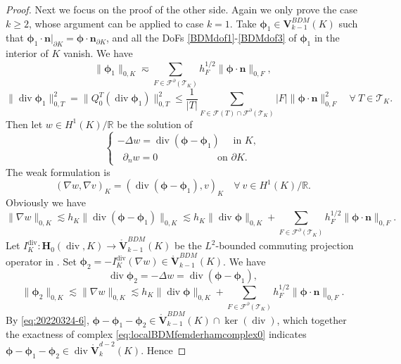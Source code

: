 \documentclass[10pt]{amsart}
\renewcommand{\div}{\operatorname{div}}
\numberwithin{equation}{section}
\begin{document}
\begin{proof}
Next we focus on the proof of the other side. Again we only prove the case $k\geq2$, whose argument can be applied to case $k=1$. Take $\boldsymbol{\phi}_1\in\boldsymbol{V}_{k-1}^{BDM}(K)$ such that $\boldsymbol{\phi}_1\cdot\boldsymbol{n}|_{\partial K}=\boldsymbol{\phi}\cdot\boldsymbol{n}_{\partial K}$, and all the DoFs \eqref{BDMdof1}-\eqref{BDMdof3} of $\boldsymbol{\phi}_1$ in the interior of $K$ vanish. We have
\begin{equation}\label{eq:20220324-5}
\|\boldsymbol{\phi}_1\|_{0,K}\eqsim \sum_{F\in\mathcal F^{\partial}(\mathcal T_K)}h_F^{1/2}\|\boldsymbol{\phi}\cdot\boldsymbol{n}\|_{0,F},
\end{equation}
$$
\|\div\boldsymbol{\phi}_1\|_{0,T}^2=\|Q_0^T(\div\boldsymbol{\phi}_1)\|_{0,T}^2
\leq\frac{1}{|T|}\sum_{F\in\mathcal F(T)\cap\mathcal F^{\partial}(\mathcal T_K)}|F|\|\boldsymbol{\phi}\cdot\boldsymbol{n}\|_{0,F}^2\quad\forall~T\in\mathcal T_K.
$$
Then let $w\in H^1(K)/\mathbb R$ be the solution of 
$$
\begin{cases}
-\Delta w= \div(\boldsymbol{\phi}-\boldsymbol{\phi}_1)\quad\textrm{ in } K, \\
\;\;\partial_nw=0\qquad\qquad\quad\;\;\,\textrm{ on } \partial K.
\end{cases}
$$
The weak formulation is
$$
(\nabla w, \nabla v)_K=(\div(\boldsymbol{\phi}-\boldsymbol{\phi}_1), v)_K\quad\forall~v\in H^1(K)/\mathbb R.
$$
Obviously we have
$$
\|\nabla w\|_{0,K}\lesssim h_K\|\div(\boldsymbol{\phi}-\boldsymbol{\phi}_1)\|_{0,K}\lesssim h_K\|\div\boldsymbol{\phi}\|_{0,K} +\sum_{F\in\mathcal F^{\partial}(\mathcal T_K)}h_F^{1/2}\|\boldsymbol{\phi}\cdot\boldsymbol{n}\|_{0,F}.
$$
Let $I_K^{\div}: \boldsymbol{H}_0(\div,K)\to\mathring{\boldsymbol{V}}_{k-1}^{BDM}(K)$ be the $L^2$-bounded commuting projection operator in \cite{ChristiansenWinther2008}. Set $\boldsymbol{\phi}_2=-I_K^{\div}(\nabla w)\in\mathring{\boldsymbol{V}}_{k-1}^{BDM}(K)$. We have
\begin{equation}\label{eq:20220324-6}
\div\boldsymbol{\phi}_2=-\Delta w=\div(\boldsymbol{\phi}-\boldsymbol{\phi}_1),
\end{equation}
\begin{equation}\label{eq:20220324-7}
\|\boldsymbol{\phi}_2\|_{0,K}\lesssim \|\nabla w\|_{0,K}\lesssim h_K\|\div\boldsymbol{\phi}\|_{0,K} +\sum_{F\in\mathcal F^{\partial}(\mathcal T_K)}h_F^{1/2}\|\boldsymbol{\phi}\cdot\boldsymbol{n}\|_{0,F}.
\end{equation}
By \eqref{eq:20220324-6}, $\boldsymbol{\phi}-\boldsymbol{\phi}_1-\boldsymbol{\phi}_2\in\mathring{\boldsymbol{V}}_{k-1}^{BDM}(K)\cap\ker(\div)$, which together the exactness of complex \eqref{eq:localBDMfemderhamcomplex0} indicates $\boldsymbol{\phi}-\boldsymbol{\phi}_1-\boldsymbol{\phi}_2\in\div\mathring{\boldsymbol{V}}_{k}^{d-2}(K)$. Hence

\end{proof}
\end{document}
